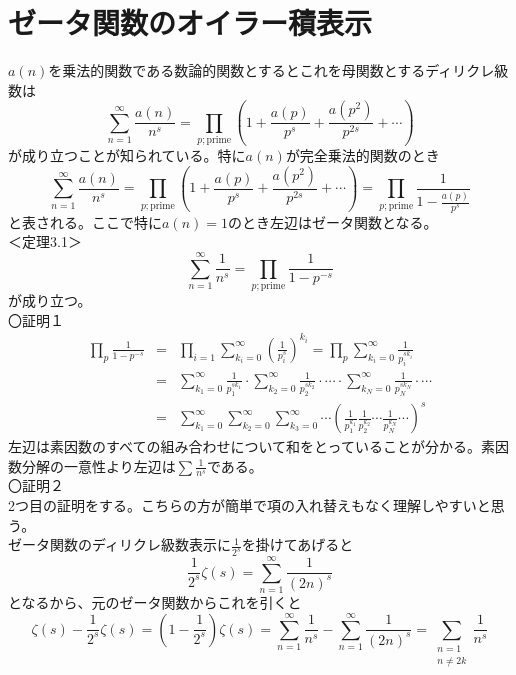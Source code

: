 \documentclass{jsarticle}
\begin{document}
\section{ゼータ関数のオイラー積表示}
\(a(n)\)を乗法的関数である数論的関数とするとこれを母関数とするディリクレ級数は
\begin{equation}
\sum_{n=1}^{\infty}\frac{a(n)}{n^{s}}=\prod_{p;\mathrm{prime}}\left(1+\frac{a(p)}{p^{s}}+\frac{a(p^{2})}{p^{2s}}+\cdots\right)
\end{equation}
が成り立つことが知られている。特に\(a(n)\)が完全乗法的関数のとき
\begin{equation}
\sum_{n=1}^{\infty}\frac{a(n)}{n^{s}}=\prod_{p;\mathrm{prime}}\left(1+\frac{a(p)}{p^{s}}+\frac{a(p^{2})}{p^{2s}}+\cdots\right)
=\prod_{p;\mathrm{prime}}\frac{1}{1-\frac{a(p)}{p^{s}}}
\end{equation}
と表される。ここで特に\(a(n)=1\)のとき左辺はゼータ関数となる。\\
＜定理3.1＞\\
\begin{equation}
\sum_{n=1}^{\infty}\frac{1}{n^{s}}=\prod_{p;\mathrm{prime}}\frac{1}{1-p^{-s}}
\end{equation}
が成り立つ。\\
〇証明１\\
\begin{eqnarray*}
\prod_{p}\frac{1}{1-p^{-s}}&=&\prod_{i=1}\sum_{k_{i}=0}^{\infty}\left(\frac{1}{p_{i}^{s}}\right)^{k_{i}}=\prod_{p}\sum_{k_{i}=0}^{\infty}\frac{1}{p_{i}^{sk_{i}}}\\
&=&\sum_{k_{1}=0}^{\infty}\frac{1}{p_{1}^{sk_{1}}}\cdot\sum_{k_{2}=0}^{\infty}\frac{1}{p_{2}^{sk_{2}}}\cdot\cdots\cdot\sum_{k_{N}=0}^{\infty}\frac{1}{p_{N}^{sk_{N}}}\cdot\cdots\\
&=&\sum_{k_{1}=0}^{\infty}\sum_{k_{2}=0}^{\infty}\sum_{k_{3}=0}^{\infty}\cdots\left(\frac{1}{p_{1}^{k_{1}}}\frac{1}{p_{2}^{k_{2}}}\cdots\frac{1}{p_{N}^{k_{N}}}\cdots\right)^{s}
\end{eqnarray*}
左辺は素因数のすべての組み合わせについて和をとっていることが分かる。素因数分解の一意性より左辺は\(\sum\frac{1}{n^{s}}\)である。\\
〇証明２\\
2つ目の証明をする。こちらの方が簡単で項の入れ替えもなく理解しやすいと思う。\\
ゼータ関数のディリクレ級数表示に\(\frac{1}{2^{s}}\)を掛けてあげると
\[\frac{1}{2^{s}}\zeta(s)=\sum_{n=1}^{\infty}\frac{1}{(2n)^{s}}\]となるから、元のゼータ関数からこれを引くと
\[\zeta(s)-\frac{1}{2^{s}}\zeta(s)=\left(1-\frac{1}{2^{s}}\right)\zeta(s)=\sum_{n=1}^{\infty}\frac{1}{n^{s}}-\sum_{n=1}^{\infty}\frac{1}{(2n)^{s}}=\sum_{\substack {n=1 \\ n\neq 2k}}\frac{1}{n^{s}}\]
\end{document}
